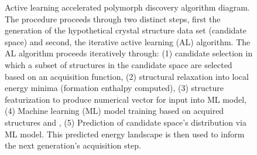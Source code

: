 \begin{figure}[!htb]
\centering
{}
\caption{\label{fig:all_diagram}
%
Active learning accelerated polymorph discovery algorithm diagram.
%
The procedure proceeds through two distinct steps,
first the generation of the hypothetical crystal structure data set (candidate space) and second,
the iterative active learning (AL) algorithm.
%
The AL algorithm proceeds iteratively through:
(1) candidate selection in which a subset of structures in the candidate space are selected based on an acquisition function,
(2) structural relaxation into local energy minima (formation enthalpy computed),
(3) structure featurization to produce numerical vector for input into ML model,
(4) Machine learning (ML) model training based on acquired structures and \DHf,
(5) Prediction of candidate space's \DHf distribution via ML model.
%
This predicted energy landscape is then used to inform the next generation's acquisition step.
}
\end{figure}


